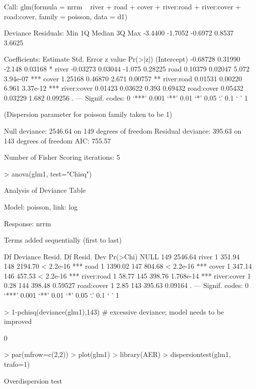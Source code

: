 \documentclass{article}
\begin{document}
\begin{Schunk}
\begin{Soutput}
Call:
glm(formula = nrrm ~ river + road + cover + river:road + river:cover + 
    road:cover, family = poisson, data = d1)

Deviance Residuals: 
    Min       1Q   Median       3Q      Max  
-3.4400  -1.7052  -0.6972   0.8537   3.6625  

Coefficients:
            Estimate Std. Error z value Pr(>|z|)    
(Intercept) -0.68728    0.31990  -2.148  0.03168 *  
river       -0.03273    0.03044  -1.075  0.28225    
road         0.10379    0.02047   5.072 3.94e-07 ***
cover        1.25168    0.46870   2.671  0.00757 ** 
river:road   0.01531    0.00220   6.961 3.37e-12 ***
river:cover  0.01423    0.03622   0.393  0.69432    
road:cover   0.05432    0.03229   1.682  0.09256 .  
---
Signif. codes:  0 ‘***’ 0.001 ‘**’ 0.01 ‘*’ 0.05 ‘.’ 0.1 ‘ ’ 1

(Dispersion parameter for poisson family taken to be 1)

    Null deviance: 2546.64  on 149  degrees of freedom
Residual deviance:  395.63  on 143  degrees of freedom
AIC: 755.57

Number of Fisher Scoring iterations: 5
\end{Soutput}
\begin{Sinput}
> anova(glm1, test="Chisq")
\end{Sinput}
\begin{Soutput}
Analysis of Deviance Table

Model: poisson, link: log

Response: nrrm

Terms added sequentially (first to last)


            Df Deviance Resid. Df Resid. Dev  Pr(>Chi)    
NULL                          149    2546.64              
river        1   351.94       148    2194.70 < 2.2e-16 ***
road         1  1390.02       147     804.68 < 2.2e-16 ***
cover        1   347.14       146     457.53 < 2.2e-16 ***
river:road   1    58.77       145     398.76 1.768e-14 ***
river:cover  1     0.28       144     398.48   0.59527    
road:cover   1     2.85       143     395.63   0.09164 .  
---
Signif. codes:  0 ‘***’ 0.001 ‘**’ 0.01 ‘*’ 0.05 ‘.’ 0.1 ‘ ’ 1
\end{Soutput}
\begin{Sinput}
> 1-pchisq(deviance(glm1),143) # excessive deviance; model needs to be improved
\end{Sinput}
\begin{Soutput}
[1] 0
\end{Soutput}
\begin{Sinput}
> par(mfrow=c(2,2))
> plot(glm1)
> library(AER)
> dispersiontest(glm1, trafo=1)
\end{Sinput}
\begin{Soutput}
	Overdispersion test


\end{Soutput}
\end{Schunk}
\end{document}
